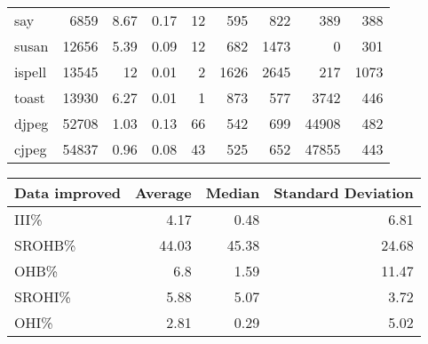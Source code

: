 \begin{tabular}{lrrrrrrrr}
 say            &           6859 &     8.67 &   0.17 &   12 &    595 &          822 &   389 &   388 \\
 susan          &          12656 &     5.39 &   0.09 &   12 &    682 &         1473 &     0 &   301 \\
 ispell         &          13545 &    12    &   0.01 &    2 &   1626 &         2645 &   217 &  1073 \\
 toast          &          13930 &     6.27 &   0.01 &    1 &    873 &          577 &  3742 &   446 \\
 djpeg          &          52708 &     1.03 &   0.13 &   66 &    542 &          699 & 44908 &   482 \\
 cjpeg          &          54837 &     0.96 &   0.08 &   43 &    525 &          652 & 47855 &   443 \\
\hline
\end{tabular}\begin{tabular}{lrrr}
\hline
 Data improved   &   Average &   Median &   Standard Deviation \\
\hline
 III\%            &      4.17 &     0.48 &                 6.81 \\
 SROHB\%          &     44.03 &    45.38 &                24.68 \\
 OHB\%            &      6.8  &     1.59 &                11.47 \\
 SROHI\%          &      5.88 &     5.07 &                 3.72 \\
 OHI\%            &      2.81 &     0.29 &                 5.02 \\
\hline
\end{tabular}